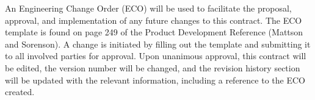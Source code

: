 


An Engineering Change Order (ECO) will be used to facilitate the proposal, approval, and implementation of any future changes to this contract. The ECO template is found on page 249 of the Product Development Reference (Mattson and Sorenson). A change is initiated by filling out the template and submitting it to all involved parties for approval. Upon unanimous approval, this contract will be edited, the version number will be changed, and the revision history section will be updated with the relevant information, including a reference to the ECO created.
